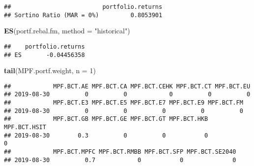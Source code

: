 \documentclass[]{article}
\newenvironment{Shaded}{\begin{snugshade}}{\end{snugshade}}
\newcommand{\DataTypeTok}[1]{\textcolor[rgb]{0.13,0.29,0.53}{#1}}
\newcommand{\DecValTok}[1]{\textcolor[rgb]{0.00,0.00,0.81}{#1}}
\newcommand{\KeywordTok}[1]{\textcolor[rgb]{0.13,0.29,0.53}{\textbf{#1}}}
\newcommand{\NormalTok}[1]{#1}
\newcommand{\StringTok}[1]{\textcolor[rgb]{0.31,0.60,0.02}{#1}}
\begin{document}
\begin{verbatim}
##                          portfolio.returns
## Sortino Ratio (MAR = 0%)         0.8053901
\end{verbatim}

\begin{Shaded}
\begin{Highlighting}[]
\KeywordTok{ES}\NormalTok{(portf.rebal.fm, }\DataTypeTok{method =} \StringTok{"historical"}\NormalTok{)}
\end{Highlighting}
\end{Shaded}

\begin{verbatim}
##    portfolio.returns
## ES       -0.04456358
\end{verbatim}

\begin{Shaded}
\begin{Highlighting}[]
\KeywordTok{tail}\NormalTok{(MPF.portf.weight, }\DataTypeTok{n =} \DecValTok{1}\NormalTok{)}
\end{Highlighting}
\end{Shaded}

\begin{verbatim}
##            MPF.BCT.AE MPF.BCT.CA MPF.BCT.CEHK MPF.BCT.CT MPF.BCT.EU
## 2019-08-30          0          0            0          0          0
##            MPF.BCT.E3 MPF.BCT.E5 MPF.BCT.E7 MPF.BCT.E9 MPF.BCT.FM
## 2019-08-30          0          0          0          0          0
##            MPF.BCT.GB MPF.BCT.GE MPF.BCT.GT MPF.BCT.HKB MPF.BCT.HSIT
## 2019-08-30        0.3          0          0           0            0
##            MPF.BCT.MPFC MPF.BCT.RMBB MPF.BCT.SFP MPF.BCT.SE2040
## 2019-08-30          0.7            0           0              0
\end{verbatim}
\end{document}
